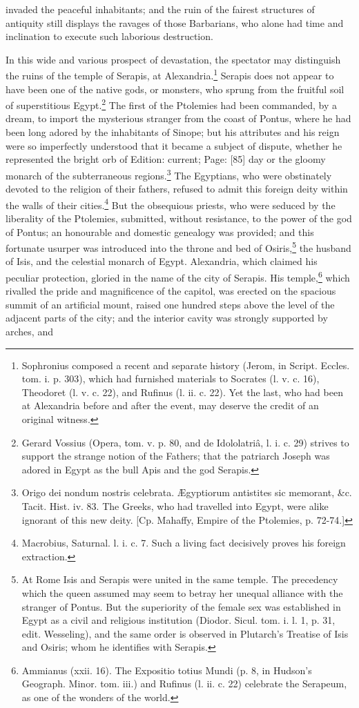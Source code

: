 invaded the peaceful inhabitants; and the ruin of the fairest structures of antiquity still displays the ravages of those Barbarians, who alone had time and inclination to execute such laborious destruction.

In this wide and various prospect of devastation, the spectator may distinguish the ruins of the temple of Serapis, at Alexandria.\footnote{Sophronius composed a recent and separate history (Jerom, in Script. Eccles. tom. i. p. 303), which had furnished materials to Socrates (l. v. c. 16), Theodoret (l. v. c. 22), and Rufinus (l. ii. c. 22). Yet the last, who had been at Alexandria before and after the event, may deserve the credit of an original witness.} Serapis does not appear to have been one of the native gods, or monsters, who sprung from the fruitful soil of superstitious Egypt.\footnote{Gerard Vossius (Opera, tom. v. p. 80, and de Idololatriâ, l. i. c. 29) strives to support the strange notion of the Fathers; that the patriarch Joseph was adored in Egypt as the bull Apis and the god Serapis.} The first of the Ptolemies had been commanded, by a dream, to import the mysterious stranger from the coast of Pontus, where he had been long adored by the inhabitants of Sinope; but his attributes and his reign were so imperfectly understood that it became a subject of dispute, whether he represented the bright orb of Edition: current; Page: [85] day or the gloomy monarch of the subterraneous regions.\footnote{Origo dei nondum nostris celebrata. Ægyptiorum antistites sic memorant, \&c. Tacit. Hist. iv. 83. The Greeks, who had travelled into Egypt, were alike ignorant of this new deity. [Cp. Mahaffy, Empire of the Ptolemies, p. 72-74.]} The Egyptians, who were obstinately devoted to the religion of their fathers, refused to admit this foreign deity within the walls of their cities.\footnote{Macrobius, Saturnal. l. i. c. 7. Such a living fact decisively proves his foreign extraction.} But the obsequious priests, who were seduced by the liberality of the Ptolemies, submitted, without resistance, to the power of the god of Pontus; an honourable and domestic genealogy was provided; and this fortunate usurper was introduced into the throne and bed of Osiris,\footnote{At Rome Isis and Serapis were united in the same temple. The precedency which the queen assumed may seem to betray her unequal alliance with the stranger of Pontus. But the superiority of the female sex was established in Egypt as a civil and religious institution (Diodor. Sicul. tom. i. l. 1, p. 31, edit. Wesseling), and the same order is observed in Plutarch\texthebrew{}’s Treatise of Isis and Osiris; whom he identifies with Serapis.} the husband of Isis, and the celestial monarch of Egypt. Alexandria, which claimed his peculiar protection, gloried in the name of the city of Serapis. His temple,\footnote{Ammianus (xxii. 16). The Expositio totius Mundi (p. 8, in Hudson\texthebrew{}’s Geograph. Minor. tom. iii.) and Rufinus (l. ii. c. 22) celebrate the Serapeum, as one of the wonders of the world.} which rivalled the pride and magnificence of the capitol, was erected on the spacious summit of an artificial mount, raised one hundred steps above the level of the adjacent parts of the city; and the interior cavity was strongly supported by arches, and 